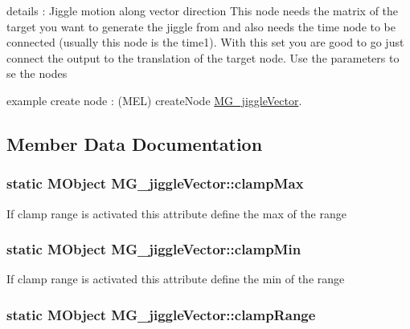 details \-: Jiggle motion along vector direction This node needs the matrix of the target you want to generate the jiggle from and also needs the time node to be connected (usually this node is the time1). With this set you are good to go just connect the output to the translation of the target node. Use the parameters to se the nodes

example create node \-: (M\-E\-L) create\-Node \hyperlink{class_m_g__jiggle_vector}{M\-G\-\_\-jiggle\-Vector}. 

\subsection{Member Data Documentation}
\hypertarget{class_m_g__jiggle_vector_a8f397a47c080b1930f2637673ddd50b8}{
\subsubsection[{clamp\-Max}]{\setlength{\rightskip}{0pt plus 5cm}static M\-Object M\-G\-\_\-jiggle\-Vector\-::clamp\-Max\hspace{0.3cm}{\ttfamily [static]}}}\label{class_m_g__jiggle_vector_a8f397a47c080b1930f2637673ddd50b8}
If clamp range is activated this attribute define the max of the range \hypertarget{class_m_g__jiggle_vector_a5f37c464cdbc951b5f71e1da2407facc}{
\subsubsection[{clamp\-Min}]{\setlength{\rightskip}{0pt plus 5cm}static M\-Object M\-G\-\_\-jiggle\-Vector\-::clamp\-Min\hspace{0.3cm}{\ttfamily [static]}}}\label{class_m_g__jiggle_vector_a5f37c464cdbc951b5f71e1da2407facc}
If clamp range is activated this attribute define the min of the range \hypertarget{class_m_g__jiggle_vector_a6fb6f77999b85dd0ed5ed38340215eb2}{
\subsubsection[{clamp\-Range}]{\setlength{\rightskip}{0pt plus 5cm}static M\-Object M\-G\-\_\-jiggle\-Vector\-::clamp\-Range\hspace{0.3cm}{\ttfamily [static]}}}\label{class_m_g__jiggle_vector_a6fb6f77999b85dd0ed5ed38340215eb2}

